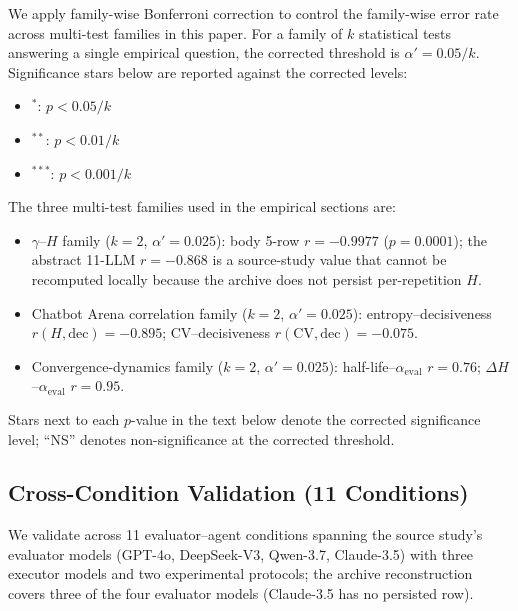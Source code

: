 \documentclass[11pt]{article}
\begin{document}
We apply family-wise Bonferroni correction to control the family-wise error rate across multi-test families in this paper. For a family of $k$ statistical tests answering a single empirical question, the corrected threshold is $\alpha' = 0.05/k$. Significance stars below are reported against the corrected levels:
\begin{itemize}[leftmargin=*,nosep]
 \item $^{*}$: $p < 0.05/k$
 \item $^{**}$: $p < 0.01/k$
 \item $^{***}$: $p < 0.001/k$
\end{itemize}
The three multi-test families used in the empirical sections are:
\begin{itemize}[leftmargin=*,nosep]
 \item $\gamma$--$H$ family ($k = 2$, $\alpha' = 0.025$): body 5-row $r = -0.9977$ ($p = 0.0001$); the abstract 11-LLM $r = -0.868$ is a source-study value that cannot be recomputed locally because the archive does not persist per-repetition $H$.
 \item Chatbot Arena correlation family ($k = 2$, $\alpha' = 0.025$): entropy--decisiveness $r(H, \text{dec}) = -0.895$; CV--decisiveness $r(\mathrm{CV}, \text{dec}) = -0.075$.
 \item Convergence-dynamics family ($k = 2$, $\alpha' = 0.025$): half-life--$\alpha_{\text{eval}}$ $r = 0.76$; $\Delta H$--$\alpha_{\text{eval}}$ $r = 0.95$.
\end{itemize}
Stars next to each $p$-value in the text below denote the corrected significance level; ``NS'' denotes non-significance at the corrected threshold.

\subsection{Cross-Condition Validation (11 Conditions)}

We validate across 11 evaluator--agent conditions spanning the source study's evaluator models (GPT-4o, DeepSeek-V3, Qwen-3.7, Claude-3.5) with three executor models and two experimental protocols; the archive reconstruction covers three of the four evaluator models (Claude-3.5 has no persisted row).
\end{document}
